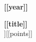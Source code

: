 
\noindent\begin{minipage}[t]{.2\linewidth}
\hfill \noindent \bf{[[year]]}
\end{minipage}
\hspace{2mm}\vline \hspace{2mm} 
\begin{minipage}[t]{.80\linewidth}
\textbf{[[title]]}\\[[org]][[points]]
\end{minipage}\\
\vspace{.1cm}

